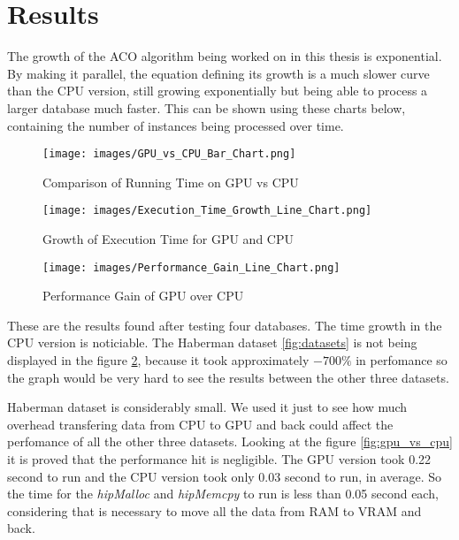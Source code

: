 \section{Results} \label{Results}

The growth of the ACO algorithm being worked on in this thesis is exponential.
By making it parallel, the equation defining its growth is a much slower curve than the CPU version,
still growing exponentially but being able to process a larger database much faster.
This can be shown using these charts below, containing the number of instances being processed over time.

\begin{figure}[ht]
    \centering
    \begin{minipage}{0.48\textwidth}
        \centering
        \texttt{[image: images/GPU\_vs\_CPU\_Bar\_Chart.png]}
        \caption{Comparison of Running Time on GPU vs CPU}
        \label{fig:gpu_vs_cpu}
    \end{minipage}\hfill
    \begin{minipage}{0.48\textwidth}
        \centering
        \texttt{[image: images/Execution\_Time\_Growth\_Line\_Chart.png]}
        \caption{Growth of Execution Time for GPU and CPU}
        \label{fig:execution_time_growth}
    \end{minipage}
\end{figure}


\begin{figure}[ht]
    \centering
    \texttt{[image: images/Performance\_Gain\_Line\_Chart.png]}
    \caption{Performance Gain of GPU over CPU}
    \label{fig:performance_gain}
\end{figure}

These are the results found after testing four databases. The time growth in the CPU version is noticiable.
The Haberman dataset \ref{fig:datasets} is not being displayed in the figure \ref{fig:performance_gain}, because it took approximately $-700\%$
in perfomance so the graph would be very hard to see the results between the other three datasets.

Haberman dataset is considerably small. We used it just to see how much overhead transfering data from CPU to GPU and back
could affect the perfomance of all the other three datasets. Looking at the figure \ref{fig:gpu_vs_cpu} it is proved that
the performance hit is negligible. The GPU version took 0.22 second to run and the CPU version took only
0.03 second to run, in average. So the time for the \emph{hipMalloc} and \emph{hipMemcpy} to run is less than 0.05 second each,
considering that is necessary to move all the data from RAM to VRAM and back.
